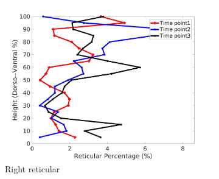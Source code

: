 \begin{figure}[H]
\begin{subfigure}{.42\linewidth}
  \includegraphics[width=\linewidth,trim={{.0\wd0} {.0\wd0} {.0\wd0} {.0\wd0}},clip]{QuantitativeAnalysis/Image/IPF21RightLungReticularDiseaseDorsoToVentral.jpg}
  \caption{Right reticular}
  \label{fig:IPF21DiseaseDorsoToVentralMain-d}
\end{subfigure}
\begin{subfigure}{.42\linewidth}%

\end{subfigure}
\end{figure}
